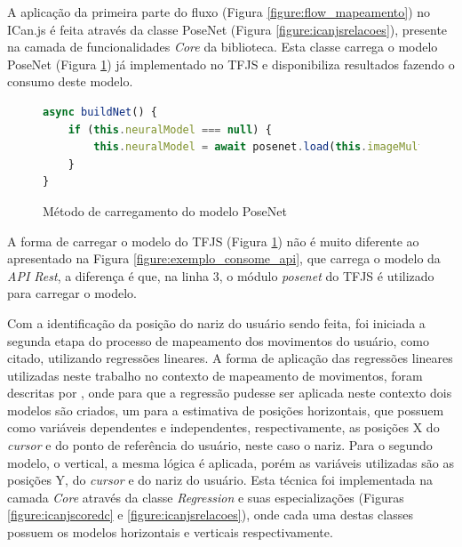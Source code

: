 
\par A aplicação da primeira parte do fluxo (Figura \ref{figure:flow_mapeamento}) no ICan.js é feita através da classe PoseNet (Figura \ref{figure:icanjsrelacoes}), presente na camada de funcionalidades \textit{Core} da biblioteca. Esta classe carrega o modelo PoseNet (Figura \ref{figure:funcao_carregamento_posenet}) já implementado no TFJS e disponibiliza resultados fazendo o consumo deste modelo.

\begin{figure}[H]
    \centering
    \caption{Método de carregamento do modelo PoseNet}
    \begin{lstlisting}[language=JavaScript]
async buildNet() {
    if (this.neuralModel === null) {
        this.neuralModel = await posenet.load(this.imageMultiplier);
    }
}
    \end{lstlisting}
    \label{figure:funcao_carregamento_posenet}
\end{figure}

\par A forma de carregar o modelo do TFJS (Figura \ref{figure:funcao_carregamento_posenet}) não é muito diferente ao apresentado na Figura \ref{figure:exemplo_consome_api}, que carrega o modelo da \textit{API Rest}, a diferença é que, na linha 3, o módulo \textit{posenet} do TFJS é utilizado para carregar o modelo.

\par Com a identificação da posição do nariz do usuário sendo feita, foi iniciada a segunda etapa do processo de mapeamento dos movimentos do usuário, como citado, utilizando regressões lineares. A forma de aplicação das regressões lineares utilizadas neste trabalho no contexto de mapeamento de movimentos, foram descritas por , onde para que a regressão pudesse ser aplicada neste contexto dois modelos são criados, um para a estimativa de posições horizontais, que possuem como variáveis dependentes e independentes, respectivamente, as posições X do \textit{cursor} e do ponto de referência do usuário, neste caso o nariz. Para o segundo modelo, o vertical, a mesma lógica é aplicada, porém as variáveis utilizadas são as posições Y, do \textit{cursor} e do nariz do usuário. Esta técnica foi implementada na camada \textit{Core} através da classe \textit{Regression} e suas especializações (Figuras \ref{figure:icanjscoredc} e \ref{figure:icanjsrelacoes}), onde cada uma destas classes possuem os modelos horizontais e verticais respectivamente.

